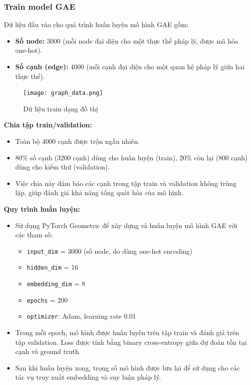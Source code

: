 \documentclass[a4paper]{article}
\begin{document}
\subsubsection{Train model GAE}

Dữ liệu đầu vào cho quá trình huấn luyện mô hình GAE gồm:
\begin{itemize}
    \item \textbf{Số node:} 3000 (mỗi node đại diện cho một thực thể pháp lý, được mã hóa one-hot).
    \item \textbf{Số cạnh (edge):} 4000 (mỗi cạnh đại diện cho một quan hệ pháp lý giữa hai thực thể).
\end{itemize}
\begin{figure}[H]
    \centering
    \texttt{[image: graph\_data.png]}
    \caption{Dữ liệu train dạng đồ thị}
\end{figure}

\textbf{Chia tập train/validation:}
\begin{itemize}
    \item Toàn bộ 4000 cạnh được trộn ngẫu nhiên.
    \item 80\% số cạnh (3200 cạnh) dùng cho huấn luyện (train), 20\% còn lại (800 cạnh) dùng cho kiểm thử (validation).
    \item Việc chia này đảm bảo các cạnh trong tập train và validation không trùng lặp, giúp đánh giá khả năng tổng quát hóa của mô hình.
\end{itemize}

\textbf{Quy trình huấn luyện:}
\begin{itemize}
    \item Sử dụng PyTorch Geometric để xây dựng và huấn luyện mô hình GAE với các tham số:
    \begin{itemize}
        \item \texttt{input\_dim} = 3000 (số node, do dùng one-hot encoding)
        \item \texttt{hidden\_dim} = 16
        \item \texttt{embedding\_dim} = 8
        \item \texttt{epochs} = 200
        \item \texttt{optimizer}: Adam, learning rate 0.01
    \end{itemize}
    \item Trong mỗi epoch, mô hình được huấn luyện trên tập train và đánh giá trên tập validation. Loss được tính bằng binary cross-entropy giữa dự đoán tồn tại cạnh và ground truth.
    \item Sau khi huấn luyện xong, trọng số mô hình được lưu lại để sử dụng cho các tác vụ truy xuất embedding và suy luận pháp lý.
\end{itemize}
\end{document}
